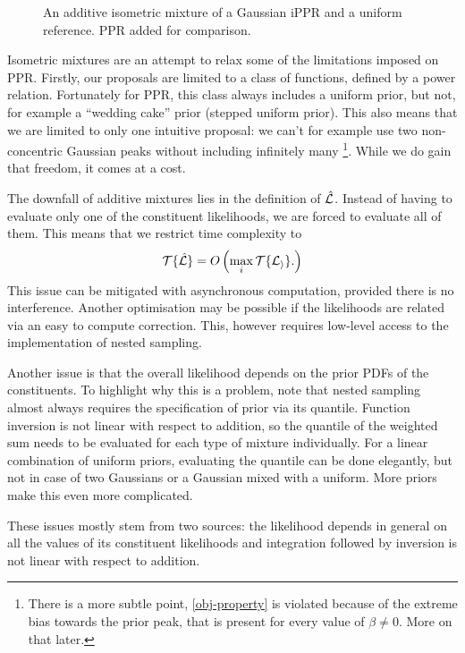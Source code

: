 \documentclass[usenatbib]{mnras}
\begin{document}
\begin{figure}
  
  \caption{\label{fig:additive} An additive isometric mixture of a
    Gaussian iPPR and a uniform reference. PPR added for comparison.}
\end{figure}

Isometric mixtures are an attempt to relax some of the limitations
imposed on PPR. Firstly, our proposals are limited to a class of
functions, defined by a power relation. Fortunately for PPR, this
class always includes a uniform prior, but not, for example a
``wedding cake'' prior (stepped uniform prior). This also means that
we are limited to only one intuitive proposal: we can't for example use
two non-concentric Gaussian peaks without including infinitely many \footnote{There is a more subtle point,
  \cref{obj-property} is violated because of the extreme bias towards
  the prior peak, that is present for every value of $\beta\ne0$. More
  on that later.}. While we do gain that freedom, it comes at a cost.

The downfall of additive mixtures lies in the definition of
$\hat{\cal L}$. Instead of having to evaluate only one of the
constituent likelihoods, we are forced to evaluate all of them. This
means that we restrict time complexity to
\begin{equation}
  {\cal T}\{\hat{\cal L}\} = O \left(   \max_{i} {\cal T}\{ {\cal L_{i}}\}. \right)\label{eq:hard-cap}
\end{equation}
This issue can be mitigated with asynchronous computation, provided
there is no interference. Another optimisation may be possible if the
likelihoods are related via an easy to compute correction.  This,
however requires low-level access to the implementation of nested
sampling.

Another issue is that the overall likelihood depends on the prior PDFs
of the constituents. To highlight why this is a problem, note that
nested sampling almost always requires the specification of prior via
its quantile. Function inversion is not linear with respect to
addition, so the quantile of the weighted sum needs to be evaluated
for each type of mixture individually. For a linear combination of
uniform priors, evaluating the quantile can be done elegantly, but not
in case of two Gaussians or a Gaussian mixed with a uniform. More
priors make this even more complicated.

These issues mostly stem from two sources: the likelihood depends in
general on all the values of its constituent likelihoods and
integration followed by inversion is not linear with respect to
addition.
\end{document}
